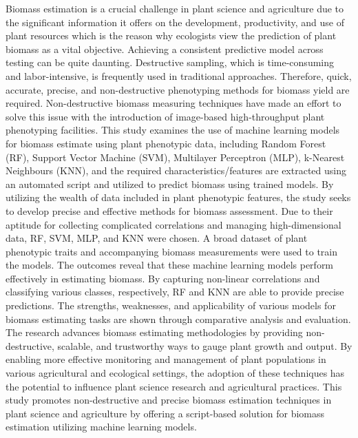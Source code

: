 \documentclass[a4paper,12pt]{report}%
\renewcommand{\\}{\vspace*{0.5\baselineskip} \newline}
\begin{document}
Biomass estimation is a crucial challenge in plant science and agriculture due to the significant information it offers on the development, productivity, and use of plant resources which is the reason why ecologists view the prediction of plant biomass as a vital objective. Achieving a consistent predictive model across testing can be quite daunting. Destructive sampling, which is time-consuming and labor-intensive, is frequently used in traditional approaches. Therefore, quick, accurate, precise, and non-destructive phenotyping methods for biomass yield are required. Non-destructive biomass measuring techniques have made an effort to solve this issue with the introduction of image-based high-throughput plant phenotyping facilities. This study examines the use of machine learning models for biomass estimate using plant phenotypic data, including Random Forest (RF), Support Vector Machine (SVM), Multilayer Perceptron (MLP), k-Nearest Neighbours (KNN), and the required characteristics/features are extracted using an automated script and utilized to predict biomass using trained models. By utilizing the wealth of data included in plant phenotypic features, the study seeks to develop precise and effective methods for biomass assessment. Due to their aptitude for collecting complicated correlations and managing high-dimensional data, RF, SVM, MLP, and KNN were chosen. A broad dataset of plant phenotypic traits and accompanying biomass measurements were used to train the models. The outcomes reveal that these machine learning models perform effectively in estimating biomass. By capturing non-linear correlations and classifying various classes, respectively, RF and KNN are able to provide precise predictions. The strengths, weaknesses, and applicability of various models for biomass estimating tasks are shown through comparative analysis and evaluation. The research advances biomass estimating methodologies by providing non-destructive, scalable, and trustworthy ways to gauge plant growth and output. By enabling more effective monitoring and management of plant populations in various agricultural and ecological settings, the adoption of these techniques has the potential to influence plant science research and agricultural practices. This study promotes non-destructive and precise biomass estimation techniques in plant science and agriculture by offering a script-based solution for biomass estimation utilizing machine learning models.
\\ \\

\newpage
\end{document}
